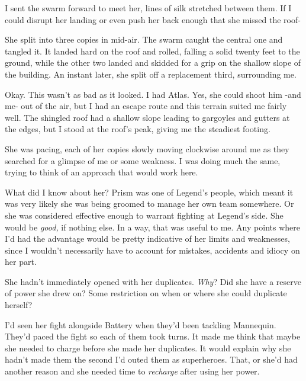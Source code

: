 I sent the swarm forward to meet her, lines of silk stretched between them.  If I could disrupt her landing or even push her back enough that she missed the roof-



She split into three copies in mid-air.  The swarm caught the central one and tangled it.  It landed hard on the roof and rolled, falling a solid twenty feet to the ground, while the other two landed and skidded for a grip on the shallow slope of the building.  An instant later, she split off a replacement third, surrounding me.



Okay.  This wasn't as bad as it looked.  I had Atlas.  Yes, she could shoot him -and me- out of the air, but I had an escape route and this terrain suited me fairly well.  The shingled roof had a shallow slope leading to gargoyles and gutters at the edges, but I stood at the roof's peak, giving me the steadiest footing.



She was pacing, each of her copies slowly moving clockwise around me as they searched for a glimpse of me or some weakness.  I was doing much the same, trying to think of an approach that would work here.



What did I know about her?  Prism was one of Legend's people, which meant it was very likely she was being groomed to manage her own team somewhere.  Or she was considered effective enough to warrant fighting at Legend's side.  She would be \emph{good,} if nothing else.\emph{  }In a way, that was useful to me.  Any points where I'd had the advantage would be pretty indicative of her limits and weaknesses, since I wouldn't necessarily have to account for mistakes, accidents and idiocy on her part.



She hadn't immediately opened with her duplicates.  \emph{Why}?  Did she have a reserve of power she drew on?  Some restriction on when or where she could duplicate herself?



I'd seen her fight alongside Battery when they'd been tackling Mannequin.  They'd paced the fight so each of them took turns.  It made me think that maybe she needed to charge before she made her duplicates.  It would explain why she hadn't made them the second I'd outed them as superheroes.  That, or she'd had another reason and she needed time to \emph{recharge} after using her power.



